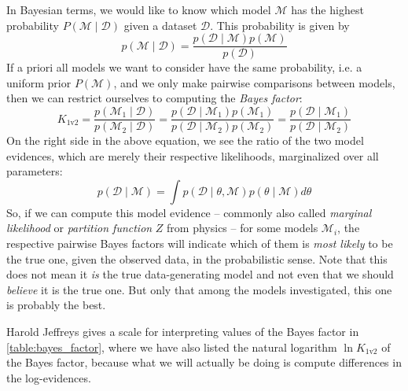 \documentclass[\relativeRoot/main.tex]{subfiles}
\begin{document}
In Bayesian terms, we would like to know which model $\mathcal{M}$ has the highest probability $P\left( \mathcal{M} \mid \boldsymbol{\mathcal{D}} \right)$ given a dataset $\boldsymbol{\mathcal{D}}$. This probability is given by
%
\begin{equation}
    p\left( \mathcal{M} \mid \boldsymbol{\mathcal{D}} \right) = \frac{p\left( \boldsymbol{\mathcal{D}} \mid \mathcal{M} \right) p\left( \mathcal{M} \right)}{p \left( \boldsymbol{\mathcal{D}} \right)}
\end{equation}
%
If a priori all models we want to consider have the same probability, i.e. a uniform prior $P \left( \mathcal{M} \right)$, and we only make pairwise comparisons between models, then we can restrict ourselves to computing the \emph{Bayes factor}:
%
\begin{equation}
    K_\text{1v2} = \frac{p\left( \mathcal{M}_1 \mid \boldsymbol{\mathcal{D}} \right)}{p\left( \mathcal{M}_2 \mid \boldsymbol{\mathcal{D}} \right)} = \frac{p\left( \boldsymbol{\mathcal{D}} \mid \mathcal{M}_1 \right) p\left( \mathcal{M}_1 \right)}{p\left( \boldsymbol{\mathcal{D}} \mid \mathcal{M}_2 \right) p\left( \mathcal{M}_2 \right)} = \frac{p\left( \boldsymbol{\mathcal{D}} \mid \mathcal{M}_1 \right)}{p\left( \boldsymbol{\mathcal{D}} \mid \mathcal{M}_2 \right)}
\end{equation}
%
On the right side in the above equation, we see the ratio of the two model evidences, which are merely their respective likelihoods, marginalized over all parameters:
%
\begin{equation} \label{eq:bayes_factor:evidence}
    p\left( \boldsymbol{\mathcal{D}} \mid \mathcal{M} \right) = \int{ p\left( \boldsymbol{\mathcal{D}} \mid \theta, \mathcal{M} \right) p(\theta \mid \mathcal{M}) d\theta}
\end{equation}
%
So, if we can compute this model evidence -- commonly also called \emph{marginal likelihood} or \emph{partition function} $Z$ from physics -- for some models $\mathcal{M}_i$, the respective pairwise Bayes factors will indicate which of them is \emph{most likely} to be the true one, given the observed data, in the probabilistic sense. Note that this does not mean it \emph{is} the true data-generating model and not even that we should \emph{believe} it is the true one. But only that among the models investigated, this one is probably the best.

Harold Jeffreys gives a scale for interpreting values of the Bayes factor \cite{jeffreys_theory_1998} in \cref{table:bayes_factor}, where we have also listed the natural logarithm $\ln{K_\text{1v2}}$ of the Bayes factor, because what we will actually be doing is compute differences in the log-evidences.
\end{document}

